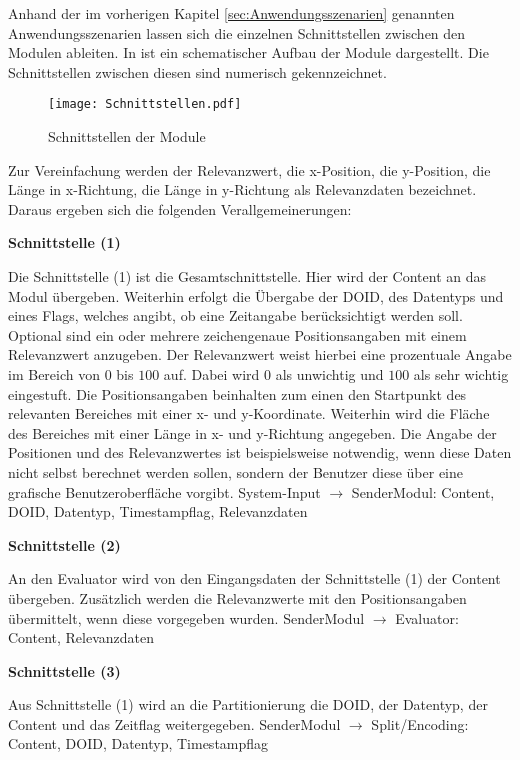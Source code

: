 Anhand der im vorherigen Kapitel \ref{sec:Anwendungsszenarien} genannten
Anwendungsszenarien lassen sich die einzelnen Schnittstellen zwischen den
Modulen ableiten. In  ist ein schematischer Aufbau
der Module dargestellt. Die Schnittstellen zwischen diesen sind numerisch
gekennzeichnet.

\begin{figure}[H]
\centering
\texttt{[image: Schnittstellen.pdf]}
\caption{Schnittstellen der Module}
\label{fig:Schnittstellen}
\end{figure}

Zur Vereinfachung werden der Relevanzwert, die x-Position, die
y-Position, die Länge in x-Richtung, die Länge in y-Richtung als Relevanzdaten
bezeichnet. Daraus ergeben sich die folgenden Verallgemeinerungen:

\textbf{Schnittstelle (1)}

Die Schnittstelle (1) ist die Gesamtschnittstelle. Hier wird der
Content an das Modul übergeben. Weiterhin erfolgt die Übergabe der \gls{DOID}, des
Datentyps und eines Flags, welches angibt, ob eine Zeitangabe berücksichtigt
werden soll.
Optional sind ein oder mehrere zeichengenaue Positionsangaben mit einem
Relevanzwert anzugeben. Der Relevanzwert weist hierbei eine
prozentuale Angabe im Bereich von $0$ bis $100$ auf. Dabei wird $0$ als
unwichtig und $100$ als sehr wichtig eingestuft. Die Positionsangaben beinhalten
zum einen den Startpunkt des relevanten Bereiches mit einer x- und y-Koordinate. Weiterhin
wird die Fläche des Bereiches mit einer Länge in x- und y-Richtung angegeben.
Die Angabe der Positionen und des Relevanzwertes ist beispielsweise notwendig,
wenn diese Daten nicht selbst berechnet werden sollen, sondern der Benutzer
diese über eine grafische Benutzeroberfläche vorgibt.\newline
System-Input $\rightarrow$ SenderModul: Content, \gls{DOID}, Datentyp,
Timestampflag, Relevanzdaten


\textbf{Schnittstelle (2)}

An den Evaluator wird von den Eingangsdaten der Schnittstelle (1)
der Content übergeben. Zusätzlich werden die Relevanzwerte mit den
Positionsangaben übermittelt, wenn diese vorgegeben wurden.\newline
SenderModul $\rightarrow$ Evaluator: Content, Relevanzdaten  

\textbf{Schnittstelle (3)} 

Aus Schnittstelle (1) wird an die Partitionierung
die \gls{DOID}, der Datentyp, der Content und das Zeitflag
weitergegeben.\newline
SenderModul $\rightarrow$ Split/Encoding: Content, \gls{DOID}, Datentyp,
Timestampflag


